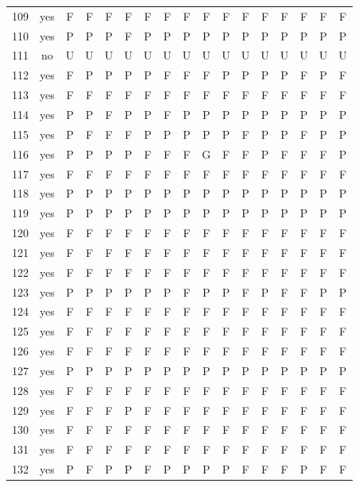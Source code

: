 \begin{table}[p]
\begin{tabular*}{\textwidth}{@{\extracolsep{\fill}}rcccccccccccccccc}
109 & yes & F & F & F & F & F & F & F & F & F & F & F & F & F & F & F\\
110 & yes & P & P & P & F & P & P & P & P & P & P & P & P & P & P & P\\
111 & no & U & U & U & U & U & U & U & U & U & U & U & U & U & U & U\\
112 & yes & F & P & P & P & P & F & F & F & P & P & P & P & F & P & F\\
113 & yes & F & F & F & F & F & F & F & F & F & F & F & F & F & F & F\\
114 & yes & P & P & F & P & P & F & P & P & P & P & P & P & P & P & P\\
115 & yes & P & F & F & F & P & P & P & P & P & F & P & P & F & P & P\\
116 & yes & P & P & P & P & F & F & F & G & F & F & P & F & F & F & P\\
117 & yes & F & F & F & F & F & F & F & F & F & F & F & F & F & F & F\\
118 & yes & P & P & P & P & P & P & P & P & P & P & P & P & P & P & P\\
119 & yes & P & P & P & P & P & P & P & P & P & P & P & P & P & P & P\\
120 & yes & F & F & F & F & F & F & F & F & F & F & F & F & F & F & F\\
121 & yes & F & F & F & F & F & F & F & F & F & F & F & F & F & F & F\\
122 & yes & F & F & F & F & F & F & F & F & F & F & F & F & F & F & F\\
123 & yes & P & P & P & P & P & P & F & P & P & F & P & F & F & P & P\\
124 & yes & F & F & F & F & F & F & F & F & F & F & F & F & F & F & F\\
125 & yes & F & F & F & F & F & F & F & F & F & F & F & F & F & F & F\\
126 & yes & F & F & F & F & F & F & F & F & F & F & F & F & F & F & F\\
127 & yes & P & P & P & P & P & P & P & P & P & P & P & P & P & P & P\\
128 & yes & F & F & F & F & F & F & F & F & F & F & F & F & F & F & F\\
129 & yes & F & F & F & P & F & F & F & F & F & F & F & F & F & F & F\\
130 & yes & F & F & F & F & F & F & F & F & F & F & F & F & F & F & F\\
131 & yes & F & F & F & F & F & F & F & F & F & F & F & F & F & F & F\\
132 & yes & P & F & P & P & F & P & P & P & P & F & F & F & P & F & F\\
\bottomrule\end{tabular*}\end{table}
\clearpage

